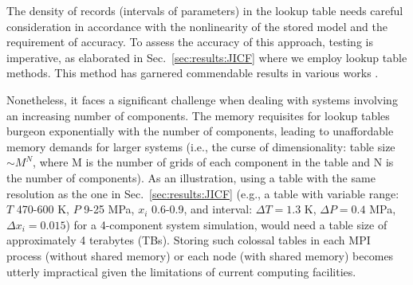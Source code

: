 

The density of records (intervals of parameters) in the lookup table needs careful consideration in accordance with the nonlinearity of the stored model and the requirement of accuracy. To assess the accuracy of this approach,  testing is imperative, as elaborated in Sec.~\ref{sec:results:JICF} where we employ lookup table methods. This method has garnered commendable results in various  works \cite{yi2019numerical,jafari2021towards,jafari2022exploring}.

Nonetheless, it faces a significant challenge when dealing with systems involving an increasing number of components. The memory requisites for lookup tables burgeon exponentially with the number of components, leading to unaffordable memory demands for larger systems (i.e., the curse of dimensionality: table size $\sim M^N$, where M is the number of grids of each component in the table and N is the number of components). As an illustration, using a table with the same resolution as the one in Sec.~\ref{sec:results:JICF} (e.g., a table with variable range: $T$ 470-600 K, $P$ 9-25 MPa, $x_i$ 0.6-0.9, and interval: $\Delta T = 1.3$ K, $\Delta P = 0.4$ MPa, $\Delta x_i = 0.015$) for a 4-component system simulation, would need a table size of approximately 4 terabytes (TBs). Storing such colossal tables in each MPI process (without shared memory) or each node (with shared memory) becomes utterly impractical given the limitations of current computing facilities.

